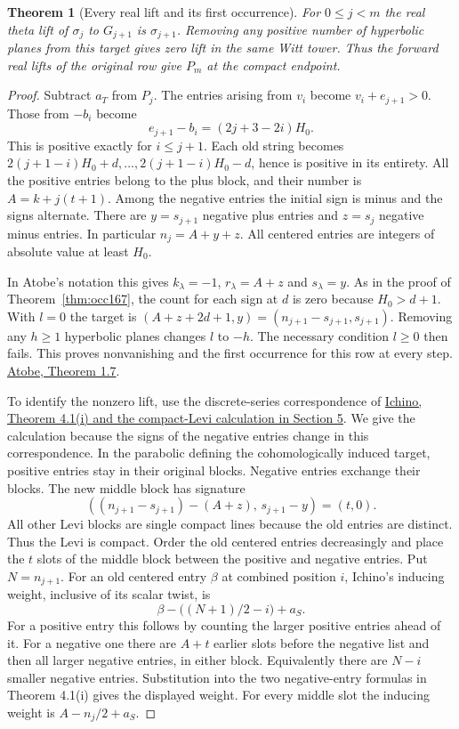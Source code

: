 \documentclass[a4paper,11pt]{article}
\newtheorem{theorem}[proposition]{Theorem}
\theoremstyle{definition}
\theoremstyle{remark}
\numberwithin{equation}{section}
\begin{document}
\begin{theorem}[Every real lift and its first occurrence]
\label{thm:tower169}
For \(0\le j<m\) the real theta lift of \(\sigma_j\) to
\(G_{j+1}\) is \(\sigma_{j+1}\). Removing any positive
number of hyperbolic planes from this target gives zero
lift in the same Witt tower. Thus the forward real lifts
of the original row give \(P_m\) at the compact endpoint.
\end{theorem}
\begin{proof}
Subtract \(a_T\) from \(P_j\). The entries arising from
\(v_i\) become \(v_i+e_{j+1}>0\). Those from \(-b_i\)
become
\[
                   e_{j+1}-b_i=(2j+3-2i)H_0 .
\]
This is positive exactly for \(i\le j+1\). Each old string
becomes \(2(j+1-i)H_0+d,\ldots,2(j+1-i)H_0-d\),
hence is positive in its entirety. All the positive entries
belong to the plus block, and their number is
\(A=k+j(t+1)\). Among the negative entries the initial sign
is minus and the signs alternate. There are
\(y=s_{j+1}\) negative plus entries and \(z=s_j\)
negative minus entries. In particular \(n_j=A+y+z\).
All centered entries are integers of absolute value at least
\(H_0\).

In Atobe's notation this gives \(k_\lambda=-1\),
\(r_\lambda=A+z\) and \(s_\lambda=y\). As in the proof of
Theorem~\ref{thm:occ167}, the count for each sign at \(d\)
is zero because \(H_0>d+1\). With \(l=0\) the target is
\((A+z+2d+1,y)=(n_{j+1}-s_{j+1},s_{j+1})\).
Removing any \(h\ge1\) hyperbolic planes changes \(l\) to
\(-h\). The necessary condition \(l\ge0\) then fails.
This proves nonvanishing and the first occurrence for this
row at every step.
\href{https://arxiv.org/pdf/1610.07794}{Atobe, Theorem 1.7}.

To identify the nonzero lift, use the discrete-series
correspondence of \href{https://arxiv.org/pdf/2002.09148}{Ichino,
Theorem 4.1(i) and the compact-Levi calculation in Section 5}.
We give the calculation
because the signs of the negative entries change in this
correspondence. In the parabolic defining the cohomologically
induced target, positive entries stay in their original
blocks. Negative entries exchange their blocks. The new
middle block has signature
\[
 ((n_{j+1}-s_{j+1})-(A+z),\,s_{j+1}-y)=(t,0).
\]
All other Levi blocks are single compact lines because the
old entries are distinct. Thus the Levi is compact. Order the
old centered entries decreasingly and place the \(t\) slots
of the middle block between the positive and negative entries.
Put \(N=n_{j+1}\).
For an old centered entry \(\beta\) at combined position \(i\),
Ichino's inducing weight, inclusive of its scalar twist, is
\[
                  \beta-\bigl((N+1)/2-i\bigr)+a_S .
\]
For a positive entry this follows by counting the larger
positive entries ahead of it. For a negative one there are
\(A+t\) earlier slots before the negative list and then all
larger negative entries, in either block. Equivalently there
are \(N-i\) smaller negative entries. Substitution into the
two negative-entry formulas in Theorem 4.1(i) gives the
displayed weight. For every middle slot the inducing weight
is \(A-n_j/2+a_S\).


\end{proof}
\end{document}
